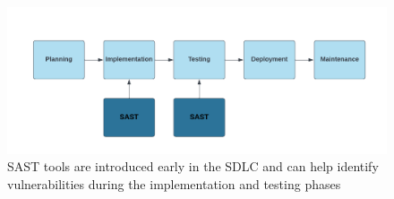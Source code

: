 \vspace{2mm}
\begin{figure}[H]
    \centering
    \includegraphics[width=0.8\columnwidth]{Images/sast.png}
    \caption{SAST tools are introduced early in the SDLC and can help identify vulnerabilities during the implementation and testing phases}
    \label{fig: Where SAST can be performed in SDLC}
\end{figure}

